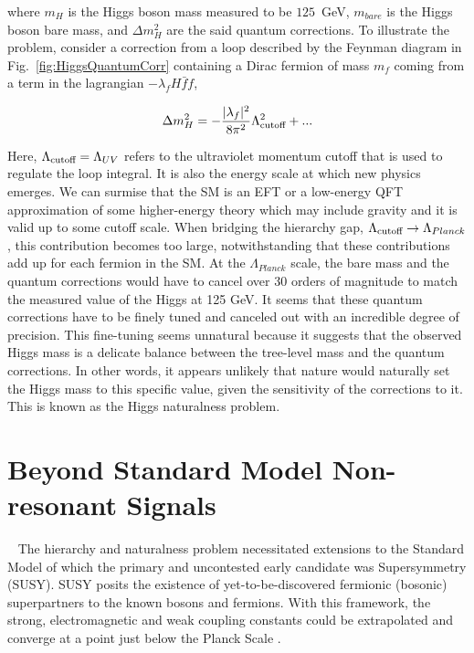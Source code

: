 where $m_H$ is the Higgs boson mass measured to be $125$~GeV, $m_{bare}$ is the Higgs boson bare mass, and $\Delta m^2_{H}$ are the said quantum corrections. To illustrate the problem, consider a correction from a loop described by the Feynman diagram in Fig.~\ref{fig:HiggsQuantumCorr} containing a Dirac fermion of mass $m_f$ coming from a term in the lagrangian $-\lambda_fH\bar{f}f$, 

\begin{equation}
    \label{eq:HiggsMass}
    \Delta m^2_{H} = - \frac{|\lambda_f|^2}{8\pi^2} \Lambda^2_{\textnormal{cutoff}} + ...
\end{equation}

Here, $\Lambda_{\textnormal{cutoff}} = \Lambda_{UV}$ refers to the ultraviolet momentum cutoff that is used to regulate the loop integral. It is also the energy scale at which new physics emerges. We can surmise that the SM is an EFT or a low-energy QFT approximation of some higher-energy theory which may include gravity and it is valid up to some cutoff scale. When bridging the hierarchy gap, $\Lambda_{\textnormal{cutoff}} \rightarrow \Lambda_{Planck}$, this contribution becomes too large, notwithstanding that these contributions add up for each fermion in the SM. At the $\Lambda_{Planck}$ scale, the bare mass and the quantum corrections would have to cancel over 30 orders of magnitude to match the measured value of the Higgs at 125 GeV. It seems that these quantum corrections have to be finely tuned and canceled out with an incredible degree of precision. This fine-tuning seems unnatural because it suggests that the observed Higgs mass is a delicate balance between the tree-level mass and the quantum corrections. In other words, it appears unlikely that nature would naturally set the Higgs mass to this specific value, given the sensitivity of the corrections to it. This is known as the Higgs naturalness problem.

\section{Beyond Standard Model Non-resonant Signals}~\label{sec:BSMNonReso}
The hierarchy and naturalness problem necessitated extensions to the Standard Model of which the primary and uncontested early candidate was Supersymmetry (SUSY). SUSY posits the existence of yet-to-be-discovered fermionic (bosonic) superpartners to the known bosons and fermions. With this framework, the strong, electromagnetic and weak coupling constants could be extrapolated and converge at a point just below the Planck Scale \cite{Martin:1997ns}.

